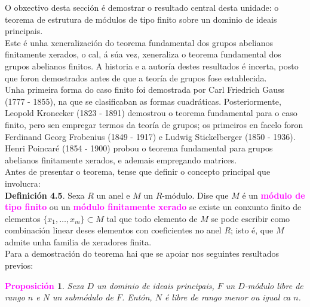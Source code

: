 \documentclass[twoside]{report}
\newcommand{\magbf}[1]{\textcolor{magenta}{\textbf{#1}}} %
\theoremstyle{mystyle}
\newtheorem{prop}{\magbf{Proposición}}[chapter]
\newenvironment{proposition}
{\begin{mdframed}[linecolor = magenta,backgroundcolor = classicrose, linewidth = 2mm]\begin{prop}}
{\end{prop}\end{mdframed}}
\begin{document}
\vspace{5mm}

\noindent O obxectivo desta sección é demostrar o resultado central desta unidade: o teorema de estrutura de módulos de tipo finito sobre un dominio de ideais principais.\\

\noindent Este é unha xeneralización do teorema fundamental dos grupos abelianos finitamente xerados, o cal, á súa vez, xeneraliza o teorema fundamental dos grupos abelianos finitos. A historia e a autoría destes resultados é incerta, posto que foron demostrados antes de que a teoría de grupos fose establecida. \\

\noindent Unha primeira forma do caso finito foi demostrada por Carl Friedrich Gauss (1777 - 1855), na que se clasificaban as formas cuadráticas. Posteriormente, Leopold Kronecker (1823 - 1891) demostrou o teorema fundamental para o caso finito, pero sen empregar termos da teoría de grupos; os primeiros en facelo foron Ferdinand Georg Frobenius (1849 - 1917) e Ludwig Stickelberger (1850 - 1936). Henri Poincaré (1854 - 1900) probou o teorema fundamental para grupos abelianos finitamente xerados, e ademais empregando matrices.\\

\noindent Antes de presentar o teorema, tense que definir o concepto principal que involucra:\\

\noindent \textbf{Definición 4.5}. Sexa $R$ un anel e $M$ un $R$-módulo. Dise que $M$ é un \magbf{módulo de tipo finito} ou un \magbf{módulo finitamente xerado} se existe un conxunto finito de elementos $\{x_{1}, \dots, x_{m}\} \subset M$ tal que todo elemento de $M$ se pode escribir como combinación linear deses elementos con coeficientes no anel $R$; isto é, que $M$ admite unha familia de xeradores finita. \\ 

\noindent Para a demostración do teorema hai que se apoiar nos seguintes resultados previos:\\

\begin{proposition} \label{prop4.1}
Sexa $D$ un dominio de ideais principais, $F$ un $D$-módulo libre de rango $n$ e $N$ un submódulo de $F$. Entón, $N$ é libre de rango menor ou igual ca $n$.
\end{proposition}

\vspace{2mm}
\end{document}
